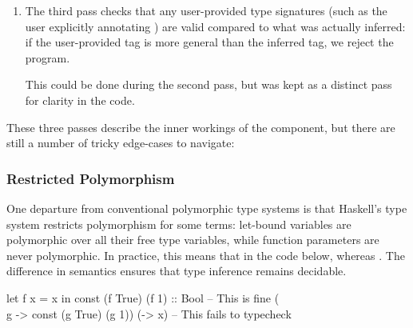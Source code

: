 \documentclass[dissertation.tex]{subfiles}
\begin{document}
{{\begin{enumerate}
{            This can't be done efficiently during the first pass: consider the expression  where the \(t_i\) are type variables tagging the expressions. Assume we've inferred that  and \haskell{(+) :: #\(\beta\rightarrow\beta\rightarrow\beta\)#} as described above, and that we've unified \(t_1\) and \(t_2\) with these types respectively. Inferring the type of the overall expression would proceed by unifying the type of the first formal argument of the function (\(\beta\)) with the first actual argument (\(\alpha\)), and then using this substitution to type the return value of the function as \(\alpha\rightarrow\alpha\rightarrow\alpha\), which we can now unify with \(t_3\). Had we previously updated the subterm's tags to be their inferred concrete types we'd now have to update them again: \(\beta\) is no longer used as it's been unified with \(\alpha\), but our subterms may still contains uses of it.
        }
        \item
        {
            The third pass checks that any user-provided type signatures (such as the user explicitly annotating ) are valid compared to what was actually inferred: if the user-provided tag is more general than the inferred tag, we reject the program. 

            This could be done during the second pass, but was kept as a distinct pass for clarity in the code.
        }
        \end{enumerate}

        These three passes describe the inner workings of the component, but there are still a number of tricky edge-cases to navigate:

        \subsubsection{Restricted Polymorphism}
        {
            One departure from conventional polymorphic type systems is that Haskell's type system restricts polymorphism for some terms: let-bound variables are polymorphic over all their free type variables, while function parameters are never polymorphic. In practice, this means that in the code below,  whereas . The difference in semantics ensures that type inference remains decidable. 

            \begin{haskellfigure}
            let f x = x in const (f True) (f 1) :: Bool -- This is fine
            (\\g -> const (g True) (g 1)) (\x -> x)     -- This fails to typecheck
            \end{haskellfigure}
        }
}}
\end{document}
